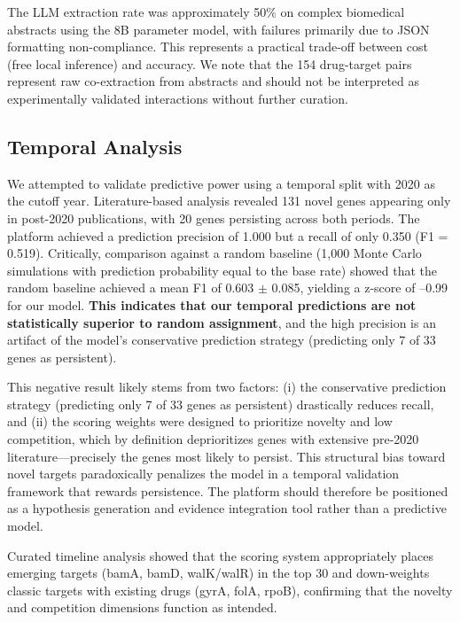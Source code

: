 \documentclass[12pt,a4paper]{article}
\begin{document}
The LLM extraction rate was approximately 50\% on complex biomedical abstracts using the 8B parameter model, with failures primarily due to JSON formatting non-compliance. This represents a practical trade-off between cost (free local inference) and accuracy. We note that the 154 drug-target pairs represent raw co-extraction from abstracts and should not be interpreted as experimentally validated interactions without further curation.

\subsection{Temporal Analysis}
We attempted to validate predictive power using a temporal split with 2020 as the cutoff year. Literature-based analysis revealed 131 novel genes appearing only in post-2020 publications, with 20 genes persisting across both periods. The platform achieved a prediction precision of 1.000 but a recall of only 0.350 (F1 = 0.519). Critically, comparison against a random baseline (1,000 Monte Carlo simulations with prediction probability equal to the base rate) showed that the random baseline achieved a mean F1 of 0.603 $\pm$ 0.085, yielding a z-score of --0.99 for our model. \textbf{This indicates that our temporal predictions are not statistically superior to random assignment}, and the high precision is an artifact of the model's conservative prediction strategy (predicting only 7 of 33 genes as persistent).

This negative result likely stems from two factors: (i) the conservative prediction strategy (predicting only 7 of 33 genes as persistent) drastically reduces recall, and (ii) the scoring weights were designed to prioritize novelty and low competition, which by definition deprioritizes genes with extensive pre-2020 literature---precisely the genes most likely to persist. This structural bias toward novel targets paradoxically penalizes the model in a temporal validation framework that rewards persistence. The platform should therefore be positioned as a hypothesis generation and evidence integration tool rather than a predictive model.

Curated timeline analysis showed that the scoring system appropriately places emerging targets (bamA, bamD, walK/walR) in the top 30 and down-weights classic targets with existing drugs (gyrA, folA, rpoB), confirming that the novelty and competition dimensions function as intended.

\end{document}
